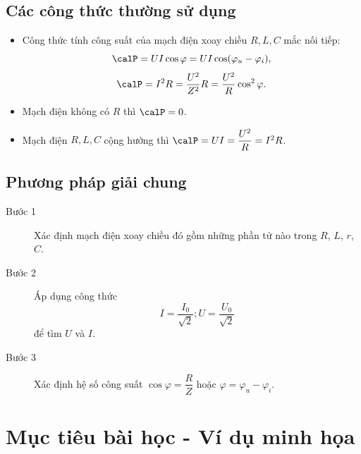 \subsection{Các công thức thường sử dụng}
\begin{itemize}
	\item  Công thức tính công suất của mạch điện xoay chiều $R, L, C$ mắc nối tiếp:
	\begin{equation*}
		\calP=UI\cos \varphi=UI\cos (\varphi_u-\varphi_i),
	\end{equation*}
	\begin{equation*}
		\calP=I^2R=\dfrac{U^2}{Z^2}R=\dfrac{U^2}{R} \cos^2 \varphi.
	\end{equation*}
	\item Mạch điện không có $R$ thì $\calP=0$.
	\item Mạch điện $R, L, C$ cộng hưởng thì $\calP=UI=\dfrac{U^2}{R}=I^2R$.
\end{itemize}

\subsection{Phương pháp giải chung}

\begin{description}
	\item[Bước 1] Xác định mạch điện xoay chiều đó gồm những phần tử nào trong $R$, $L$, $r$, $C$. 
	\item [Bước 2] Áp dụng công thức 
	\begin{equation*}
		I=\dfrac{I_0}{\sqrt 2}; U=\dfrac{U_0}{\sqrt 2}
	\end{equation*}
	để tìm $U$ và $I$.
	\item[Bước 3] Xác định hệ số công suất $\cos \varphi =  \dfrac{R}{Z}$ hoặc $\varphi = \varphi_u -\varphi_i$.
\end{description}


\section{Mục tiêu bài học - Ví dụ minh họa}

